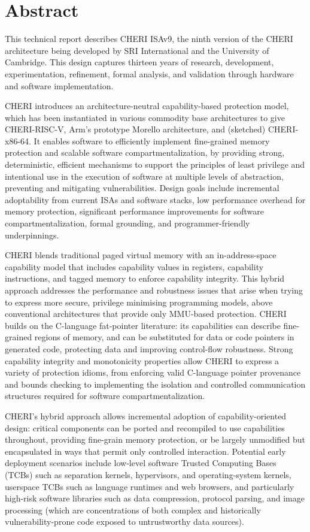 \section*{Abstract}

This technical report describes CHERI ISAv9, the ninth version of the
CHERI architecture
being developed by SRI International and the University of Cambridge.
This design captures thirteen years of research, development, experimentation,
refinement, formal analysis, and validation through hardware and software
implementation.

CHERI introduces an architecture-neutral capability-based protection
model, which has been instantiated in various commodity base architectures
to give
CHERI-RISC-V, Arm's prototype Morello architecture, and (sketched)
CHERI-x86-64.
It enables software
to efficiently implement fine-grained memory protection and scalable software
compartmentalization, by providing strong, deterministic, efficient
mechanisms to support the principles of least privilege and intentional use
in the execution of software at multiple levels of abstraction, preventing and
mitigating vulnerabilities.
Design goals include incremental adoptability from current ISAs and
software stacks, low performance overhead for memory protection, significant
performance improvements for software compartmentalization, formal grounding,
and programmer-friendly underpinnings.

CHERI blends traditional paged virtual memory with an
in-address-space capability model that includes capability values in registers,
capability instructions, and tagged memory to enforce capability integrity.
This hybrid approach addresses the performance and robustness issues that arise
when trying to express more secure, privilege minimising programming models,
above conventional architectures that provide only MMU-based protection.
CHERI builds on the C-language fat-pointer literature: its capabilities can
describe fine-grained regions of memory, and can be substituted for data or
code pointers in generated code, protecting data and improving
control-flow robustness.
Strong capability integrity and monotonicity properties allow CHERI
to express a variety of protection idioms, from enforcing valid C-language
pointer provenance and bounds checking to implementing the isolation and
controlled communication structures required for software
compartmentalization.

CHERI's hybrid approach allows incremental adoption of capability-oriented design:
critical components can be ported and recompiled to use capabilities throughout,
providing fine-grain memory protection, or be largely unmodified but encapsulated in ways that permit
only controlled interaction.
Potential early deployment scenarios include low-level software Trusted Computing
Bases (TCBs) such as separation kernels, hypervisors, and operating-system
kernels, userspace TCBs such as language runtimes and web browsers,
and particularly high-risk
software libraries such as data compression, protocol parsing, and image
processing (which are concentrations of both complex and historically
vulnerability-prone code exposed to untrustworthy data sources).

